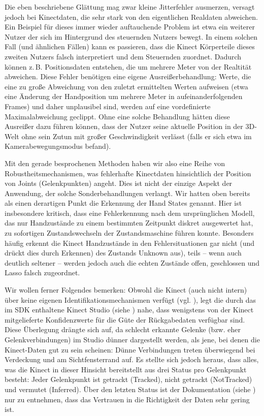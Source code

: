 	Die eben beschriebene Glättung mag zwar kleine Jitterfehler ausmerzen, versagt jedoch bei Kinectdaten, die sehr stark von den eigentlichen Realdaten abweichen. Ein Beispiel für dieses immer wieder auftauchende Problem ist etwa ein weiterer Nutzer der sich im Hintergrund des steuernden Nutzers bewegt. In einem solchen Fall (und ähnlichen Fällen) kann es passieren, dass die Kinect Körperteile dieses zweiten Nutzers falsch interpretiert und dem Steuernden zuordnet. Dadurch können z.\,B. Positionsdaten entstehen, die um mehrere Meter von der Realtität abweichen. Diese Fehler benötigen eine eigene Ausreißerbehandlung: Werte, die eine zu große Abweichung von den zuletzt ermittelten Werten aufweisen (etwa eine Änderung der Handposition um mehrere Meter in aufeinanderfolgenden Frames) und daher unplausibel sind, werden auf eine vordefinierte Maximalabweichung geclippt. Ohne eine solche Behandlung hätten diese Ausreißer dazu führen können, dass der Nutzer seine aktuelle Position in der 3D-Welt ohne sein Zutun mit großer Geschwindigkeit verlässt (falls er sich etwa im Kamerabewegungsmodus befand).\par 
	Mit den gerade besprochenen Methoden haben wir also eine Reihe von Robustheitsmechanismen, was fehlerhafte Kinectdaten hinsichtlich der Position von Joints (Gelenkpunkten) angeht. Dies ist nicht der einzige Aspekt der Anwendung, der solche Sonderbehandlungen verlangt. Wir hatten oben bereits als einen derartigen Punkt die Erkennung der \glqq Hand States\grqq{} genannt. Hier ist insbesondere kritisch, dass eine Fehlerkennung nach dem ursprünglichen Modell, das nur Handzustände zu einem bestimmten Zeitpunkt diskret ausgewertet hat, zu sofortigen Zustandswechseln der Zustandsmaschine führen konnte. Besonders häufig erkennt die Kinect Handzustände in den Fehlersituationen gar nicht (und drückt dies durch \glqq Erkennen\grqq{}) des Zustands \glqq{}Unknown\grqq{} aus), teils -- wenn auch deutlich seltener -- werden jedoch auch die \glqq echten\grqq{} Zustände \glqq offen\grqq{}, \glqq geschlossen\grqq{} und \glqq Lasso\grqq{} falsch zugeordnet.\par 
	Wir wollen ferner Folgendes bemerken: Obwohl die Kinect (auch nicht intern) über keine eigenen Identifikationsmechanismen verfügt (vgl. \cite{bodyprop}), legt die durch das im SDK enthaltene Kinect Studio (siehe \cite{kinectsdk}) nahe, dass wenigstens von der Kinect mitgelieferte Konfidenzwerte für die Güte der Rückgabedaten verfügbar sind. Diese Überlegung drängte sich auf, da schlecht erkannte Gelenke (bzw. eher Gelenkverbindungen) im Studio dünner dargestellt werden, als jene, bei denen die Kinect-Daten gut zu sein scheinen: Dünne Verbindungen treten überwiegend bei Verdeckung und am Sichtfensterrand auf. Es stellte sich jedoch heraus, dass alles, was die Kinect in dieser Hinsicht bereitstellt aus drei Status pro Gelenkpunkt besteht: Jeder Gelenkpunkt ist getrackt (\glqq Tracked\grqq), nicht getrackt (\glqq NotTracked\grqq) und vermutet (\glqq Inferred\grqq). Über den letzten Status ist der Dokumentation (siehe \cite{trackingstate}) nur zu entnehmen, dass das Vertrauen in die Richtigkeit der Daten \glqq sehr gering\grqq{} ist.\par\bigskip
